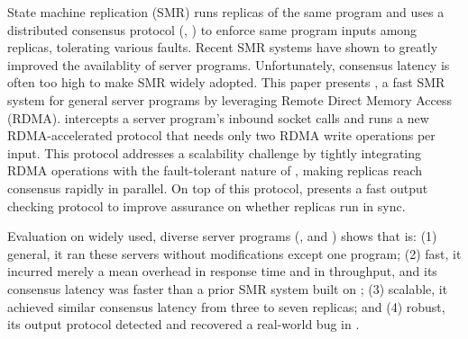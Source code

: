 

State machine replication (SMR) runs replicas of the same program and 
uses a distributed consensus protocol (\eg, \paxos) to enforce same program 
inputs among replicas, tolerating various faults. Recent SMR systems have shown 
to greatly improved the availablity of server programs. Unfortunately, consensus 
latency is often too high to make SMR widely adopted. This paper presents \xxx, 
a fast SMR system for general server programs by leveraging Remote Direct 
Memory Access (RDMA). \xxx intercepts a server program's inbound socket calls 
and runs a new RDMA-accelerated \paxos protocol that needs only two RDMA write 
operations per input. This protocol addresses a scalability challenge by 
tightly integrating RDMA operations with the fault-tolerant nature of \paxos, 
making replicas reach consensus rapidly in parallel. On top of this protocol, 
\xxx presents a fast output checking protocol to improve assurance on whether 
replicas run in sync.


Evaluation on \nprog widely used, diverse server programs (\eg, \memcached and 
\mysql) shows that \xxx is: (1) general, it ran these servers 
without modifications except one program; (2) fast, it incurred merely a 
\latencyoverhead mean overhead in response time and \tputoverhead in 
throughput, and its consensus latency was \fasterthanzookeeper faster than 
a prior SMR system built on \zookeeper; (3) scalable, it achieved similar 
consensus latency from three to seven replicas; and (4) robust, its output 
protocol detected and recovered a real-world bug in \mysql.

